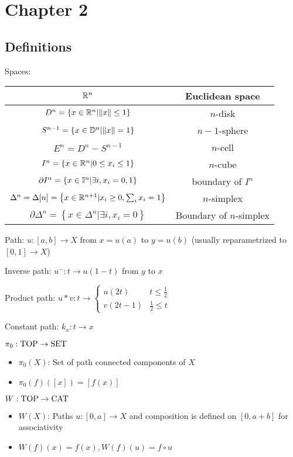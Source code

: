 \section{Chapter 2}

\subsection{Definitions}

Spaces:

\begin{tabular}{cc}\hline
    $\mathbb R^n$&Euclidean space\\\hline
    $D^n=\left\{x\in\mathbb R^n|\lVert x\rVert\leq1\right\}$&$n$-disk\\\hline
    $S^{n-1}=\left\{x\in\mathbb D^n|\lVert x\rVert=1\right\}$&$n-1$-sphere\\\hline
    $E^n=D^n-S^{n-1}$&$n$-cell\\\hline
    $I^n=\left\{x\in\mathbb R^n|0\leq x_i\leq1\right\}$&$n$-cube\\\hline
    $\partial I^n=\left\{x\in\mathbb I^n|\exists i,x_i=0,1\right\}$&boundary of $I^n$\\\hline
    $\Delta^n=\Delta[n]=\left\{x\in\mathbb R^{n+1}|x_i\geq0,\sum_ix_i=1\right\}$&$n$-simplex\\\hline
    $\partial\Delta^n=\left\{x\in\Delta^n|\exists i,x_i=0\right\}$&Boundary of $n$-simplex\\\hline
\end{tabular}

Path: $u:[a,b]\to X$ from $x=u(a)$ to $y=u(b)$ (usually reparametrized to $[0,1]\to X$)

Inverse path: $u^-:t\to u(1-t)$ from $y$ to $x$

Product path: $u*v:t\to\begin{cases}u(2t)&t\leq\frac12\\v(2t-1)&\frac12\leq t\end{cases}$

Constant path: $k_x:t\to x$

$\pi_0:\operatorname{TOP}\to\operatorname{SET}$
\begin{itemize}
    \item $\pi_0(X)$: Set of path connected components of $X$
    \item $\pi_0(f)([x])=[f(x)]$
\end{itemize}

$W:\operatorname{TOP}\to\operatorname{CAT}$
\begin{itemize}
    \item $W(X)$: Paths $u:[0,a]\to X$ and composition is defined on $[0,a+b]$ for associativity
    \item $W(f)(x)=f(x),W(f)(u)=f\circ u$
\end{itemize}

